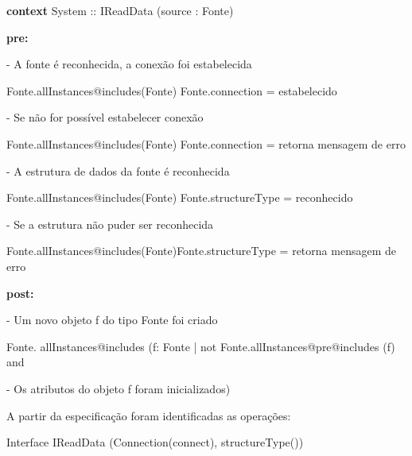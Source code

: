 \begin{minipage}[t][][b]{0.9\textwidth}
	\ttfamily
	\hrulefill

\textbf{context} System :: IReadData (source : Fonte)

\textbf{pre:}

- A fonte é reconhecida, a conexão foi estabelecida

Fonte.allInstances@includes(Fonte) Fonte.connection = estabelecido

- Se não for possível estabelecer conexão

Fonte.allInstances@includes(Fonte) Fonte.connection = retorna mensagem de erro

- A estrutura de dados da fonte é reconhecida

Fonte.allInstances@includes(Fonte) Fonte.structureType = reconhecido

- Se a estrutura não puder ser reconhecida

Fonte.allInstances@includes(Fonte)Fonte.structureType = retorna mensagem de erro

\textbf{post:}

- Um novo objeto f do tipo Fonte foi criado

Fonte. allInstances@includes (f: Fonte | not Fonte.allInstances@pre@includes (f) and

- Os atributos do objeto f foram inicializados)


\hrulefill

A partir da especificação foram identificadas as operações:

Interface IReadData
(Connection(connect), structureType())

\end{minipage}

\clearpage

